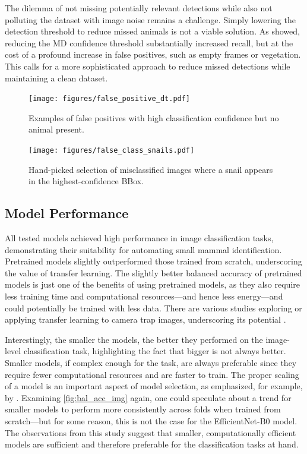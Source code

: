 The dilemma of not missing potentially relevant detections while also not polluting the dataset with image noise remains a challenge.
Simply lowering the detection threshold to reduce missed animals is not a viable solution.
As \textcite{leornaHumanVsMachine2022} showed, reducing the \ac{MD} confidence threshold substantially increased recall, but at the cost of a profound increase in false positives, such as empty frames or vegetation.
This calls for a more sophisticated approach to reduce missed detections while maintaining a clean dataset.

\begin{figure}[ht]
\centering
\texttt{[image: figures/false\_positive\_dt.pdf]}
\caption{Examples of false positives with high classification confidence but no animal present.}
\label{fig:false_positive_dt}
\end{figure}

\begin{figure}[ht]
\centering
\texttt{[image: figures/false\_class\_snails.pdf]}
\caption{Hand-picked selection of misclassified images where a snail appears in the highest-confidence BBox.}
\label{fig:false_class_snails}
\end{figure}

\subsection{Model Performance}
All tested models achieved high performance in image classification tasks, demonstrating their suitability for automating small mammal identification.
Pretrained models slightly outperformed those trained from scratch, underscoring the value of transfer learning.
The slightly better balanced accuracy of pretrained models is just one of the benefits of using pretrained models, as they also require less training time and computational resources---and hence less energy---and could potentially be trained with less data.
There are various studies exploring or applying transfer learning to camera trap images, underscoring its potential \autocite{stancicClassificationEfficiencyPreTrained2022,hopkinsDetectingMonitoringRodents2024,doanWildlifeSpeciesClassification2024,rameshExploringGeneralizabilityTransfer2025,beeryRecognitionTerraIncognita2018}.

Interestingly, the smaller the models, the better they performed on the image-level classification task, highlighting the fact that bigger is not always better.
Smaller models, if complex enough for the task, are always preferable since they require fewer computational resources and are faster to train.
The proper scaling of a model is an important aspect of model selection, as emphasized, for example, by \textcite{tanEfficientNetRethinkingModel2019}.
Examining \autoref{fig:bal_acc_img} again, one could speculate about a trend for smaller models to perform more consistently across folds when trained from scratch---but for some reason, this is not the case for the EfficientNet-B0 model.
The observations from this study suggest that smaller, computationally efficient models are sufficient and therefore preferable for the classification tasks at hand.


